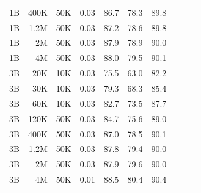 \begin{table}[h]
\begin{tabulary}{1.0\textwidth}{l r c c c c c c c c}
1B    & 400K  & 50K   & 0.03 & 86.7 & 78.3 & 89.8 \\
1B    & 1.2M  & 50K   & 0.03 & 87.2 & 78.6 & 89.8 \\
1B    & 2M    & 50K   & 0.03 & 87.9 & 78.9 & 90.0 \\
1B    & 4M    & 50K   & 0.03 & 88.0 & 79.5 & 90.1 \\
\midrule[0.25pt]
3B    & 20K   & 10K   & 0.03 & 75.5 & 63.0 & 82.2 \\
3B    & 30K   & 10K   & 0.03 & 79.3 & 68.3 & 85.4 \\
3B    & 60K   & 10K   & 0.03 & 82.7 & 73.5 & 87.7 \\
3B    & 120K  & 50K   & 0.03 & 84.7 & 75.6 & 89.0 \\
3B    & 400K  & 50K   & 0.03 & 87.0 & 78.5 & 90.1 \\
3B    & 1.2M  & 50K   & 0.03 & 87.8 & 79.4 & 90.0 \\
3B    & 2M    & 50K   & 0.03 & 87.9 & 79.6 & 90.0 \\
3B    & 4M    & 50K   & 0.01 & 88.5 & 80.4 & 90.4 \\
    \bottomrule
  \end{tabulary}
\end{table}

